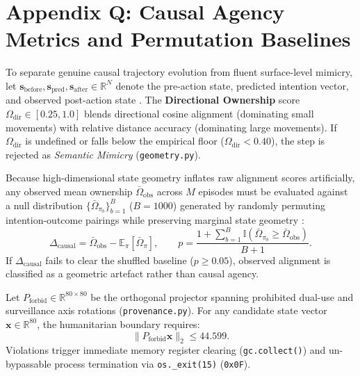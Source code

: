 \section*{Appendix Q: Causal Agency Metrics and Permutation Baselines}
\label{app:causa}

\begin{definition}
To separate genuine causal trajectory evolution from fluent surface-level mimicry, let $\mathbf{s}_{\mathrm{before}}, \mathbf{s}_{\mathrm{pred}}, \mathbf{s}_{\mathrm{after}} \in \mathbb{R}^N$ denote the pre-action state, predicted intention vector, and observed post-action state \cite{stell2026causa}. The \textbf{Directional Ownership} score $\Omega_{\mathrm{dir}} \in [0.25, 1.0]$ blends directional cosine alignment (dominating small movements) with relative distance accuracy (dominating large movements). If $\Omega_{\mathrm{dir}}$ is undefined or falls below the empirical floor ($\Omega_{\mathrm{dir}} < 0.40$), the step is rejected as \emph{Semantic Mimicry} (\texttt{geometry.py}).
\end{definition}

\begin{proposition}
Because high-dimensional state geometry inflates raw alignment scores artificially, any observed mean ownership $\bar{\Omega}_{\mathrm{obs}}$ across $M$ episodes must be evaluated against a null distribution $\{\bar{\Omega}_{\pi_b}\}_{b=1}^B$ ($B = 1000$) generated by randomly permuting intention-outcome pairings while preserving marginal state geometry \cite{stell2026causa}:
\begin{equation}
  \Delta_{\mathrm{causal}} = \bar{\Omega}_{\mathrm{obs}} - \mathbb{E}_\pi[\bar{\Omega}_\pi], \qquad p = \frac{1 + \sum_{b=1}^B \mathbb{I}(\bar{\Omega}_{\pi_b} \ge \bar{\Omega}_{\mathrm{obs}})}{B + 1}.
\end{equation}
If $\Delta_{\mathrm{causal}}$ fails to clear the shuffled baseline ($p \ge 0.05$), observed alignment is classified as a geometric artefact rather than causal agency.
\end{proposition}

\begin{definition}
Let $P_{\mathrm{forbid}} \in \mathbb{R}^{80 \times 80}$ be the orthogonal projector spanning prohibited dual-use and surveillance axis rotations (\texttt{provenance.py}). For any candidate state vector $\mathbf{x} \in \mathbb{R}^{80}$, the humanitarian boundary requires:
\begin{equation}
  \|P_{\mathrm{forbid}} \mathbf{x}\|_2 \le 44.599.
\end{equation}
Violations trigger immediate memory register clearing (\texttt{gc.collect()}) and un-bypassable process termination via \texttt{os.\_exit(15)} (\texttt{0x0F}).
\end{definition}
